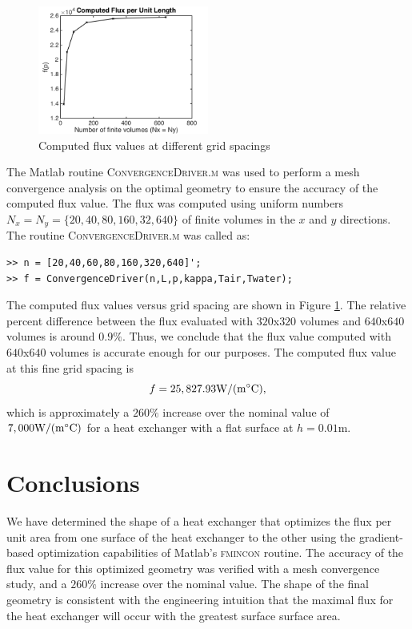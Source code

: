 \documentclass[11pt]{article}
\begin{document}
\begin{figure}[hbt]
\centering
\includegraphics[width=0.5\textwidth]{flux}
\caption{Computed flux values at different grid spacings}
\label{fig:flux}
\end{figure}

The Matlab routine \textsc{ConvergenceDriver.m} was used to
perform a mesh convergence analysis on the optimal geometry
to ensure the accuracy of the computed flux value. The flux
was computed using uniform numbers $N_x = N_y = \{20,40,80,160,32,640\}$
of finite volumes in the $x$ and $y$ directions. The routine
\textsc{ConvergenceDriver.m} was called as:
\begin{verbatim}
>> n = [20,40,60,80,160,320,640]';
>> f = ConvergenceDriver(n,L,p,kappa,Tair,Twater);
\end{verbatim}
The computed flux values versus grid spacing are shown in Figure
\ref{fig:flux}. The relative percent difference between the flux
evaluated with $320$x$320$ volumes and $640$x$640$ volumes
is around $0.9\%$. Thus, we conclude that the flux value computed
with $640$x$640$ volumes is accurate enough for our purposes.
The computed flux value at this fine grid spacing is
\begin{equation}
f = 25,827.93 \text{W}/(\text{m} \degree \text{C}),
\end{equation}
which is approximately a $260\%$ increase over the nominal value
of $7,000 \text{W}/(\text{m} \degree \text{C})$
for a heat exchanger with a flat surface at $h = 0.01$m.

\section{Conclusions}

We have determined the shape of a heat exchanger
that optimizes the  flux per unit area from one surface of the heat
exchanger to the other using the gradient-based
optimization capabilities of Matlab's \textsc{fmincon} routine.
The accuracy of the flux value for this optimized geometry was verified
with a mesh convergence study, and a $260\%$ increase over the nominal
value. The shape of the final geometry is consistent with the engineering
intuition that the maximal flux for the heat exchanger will occur
with the greatest surface surface area.
\end{document}
